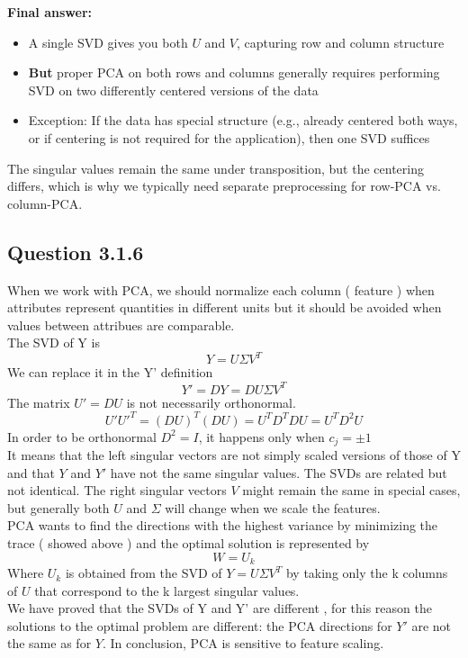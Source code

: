 \documentclass[a4paper]{scrartcl}
\begin{document}
\textbf{Final answer:}
\begin{itemize}
\item A single SVD gives you both $U$ and $V$, capturing row and column structure
\item \textbf{But} proper PCA on both rows and columns generally requires performing SVD on two differently centered versions of the data
\item Exception: If the data has special structure (e.g., already centered both ways, or if centering is not required for the application), then one SVD suffices
\end{itemize}

The singular values remain the same under transposition, but the centering differs, which is why we typically need separate preprocessing for row-PCA vs. column-PCA.
\subsection*{Question 3.1.6}
When we work with PCA, we should normalize each column ( feature ) when attributes represent quantities in different units but it should be avoided when values between attribues are comparable.\\
The SVD of Y is 
\[
Y = U \Sigma V^T
\]
We can replace it in the Y' definition
\[
Y' = D Y = D U \Sigma V^T 
\]
The matrix $U' = D U$ is not necessarily orthonormal.\\
\[
  U' U'^T = (D U)^T (D U) = U^T D^T D U = U^T D^2 U
\]
In order to be orthonormal $D^2 = I$, it happens only when $c_j = \pm 1$\\
It means that the left singular vectors are not simply scaled versions of those of Y and that $Y$ and $Y'$ have not the same singular values.
The SVDs are related but not identical. The right singular vectors $V$ might remain the same in special cases, but generally both $U$ and $\Sigma$ will change when we scale the features.\\
PCA wants to find the directions with the highest variance by  minimizing the trace ( showed above ) and the optimal solution is represented by
\[
W = U_k
\]
Where $U_k$ is obtained from the SVD of $Y = U \Sigma V^T$ by taking only the k columns of $U$ that correspond to the k largest singular values.\\
We have proved that the SVDs of Y and Y' are different , for this reason the solutions to the optimal problem are different: the PCA directions for $Y'$ are not the same as for $Y$.
In conclusion, PCA is sensitive to feature scaling.
\end{document}
